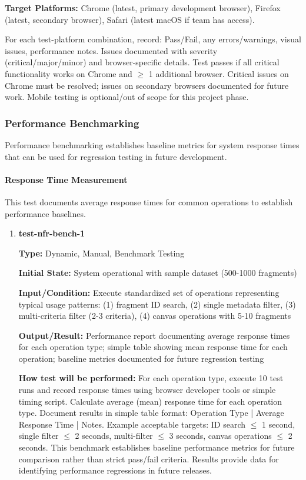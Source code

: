 \documentclass[12pt, titlepage]{article}
\begin{document}
\begin{enumerate}
\textbf{Target Platforms:} Chrome (latest, primary development browser), Firefox (latest, secondary browser), Safari (latest macOS if team has access).

For each test-platform combination, record: Pass/Fail, any errors/warnings, visual issues, performance notes. Issues documented with severity (critical/major/minor) and browser-specific details. Test passes if all critical functionality works on Chrome and $\geq$ 1 additional browser. Critical issues on Chrome must be resolved; issues on secondary browsers documented for future work. Mobile testing is optional/out of scope for this project phase.

\end{enumerate}

\subsubsection{Performance Benchmarking}

Performance benchmarking establishes baseline metrics for system response times that can be used for regression testing in future development.

\paragraph{Response Time Measurement}

This test documents average response times for common operations to establish performance baselines.

\begin{enumerate}

\item \textbf{test-nfr-bench-1}

\textbf{Type:} Dynamic, Manual, Benchmark Testing

\textbf{Initial State:} System operational with sample dataset (500-1000 fragments)

\textbf{Input/Condition:} Execute standardized set of operations representing typical usage patterns: (1) fragment ID search, (2) single metadata filter, (3) multi-criteria filter (2-3 criteria), (4) canvas operations with 5-10 fragments

\textbf{Output/Result:} Performance report documenting average response times for each operation type; simple table showing mean response time for each operation; baseline metrics documented for future regression testing

\textbf{How test will be performed:} For each operation type, execute 10 test runs and record response times using browser developer tools or simple timing script. Calculate average (mean) response time for each operation type. Document results in simple table format: Operation Type | Average Response Time | Notes. Example acceptable targets: ID search $\leq$ 1 second, single filter $\leq$ 2 seconds, multi-filter $\leq$ 3 seconds, canvas operations $\leq$ 2 seconds. This benchmark establishes baseline performance metrics for future comparison rather than strict pass/fail criteria. Results provide data for identifying performance regressions in future releases.

\end{enumerate}
\end{document}
